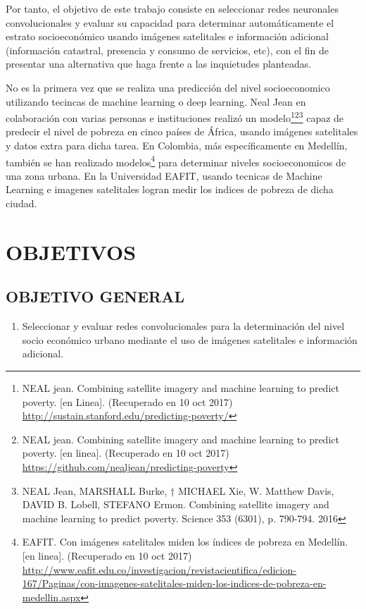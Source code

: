     Por tanto, el objetivo de este trabajo consiste en seleccionar redes neuronales convolucionales y evaluar su capacidad para determinar automáticamente el estrato socioeconómico usando imágenes satelitales e información adicional (información catastral, presencia y consumo de servicios, etc), con el fin de presentar una alternativa que haga frente a las inquietudes planteadas.
    
     No es la primera vez que se realiza una predicción del nivel socioeconomico utilizando tecincas de machine learning o deep learning. Neal Jean en colaboración con varias personas e instituciones realizó un modelo\footnote{NEAL jean. Combining satellite imagery and machine learning to predict poverty. [en Linea]. (Recuperado en 10 oct 2017) \url{http://sustain.stanford.edu/predicting-poverty/} }\footnote{NEAL jean. Combining satellite imagery and machine learning to predict poverty. [en linea]. (Recuperado en 10 oct 2017) \url{https://github.com/nealjean/predicting-poverty}}\footnote{NEAL Jean, MARSHALL Burke, † MICHAEL Xie, W. Matthew Davis, DAVID B. Lobell, STEFANO Ermon. Combining satellite imagery and machine learning to predict poverty. Science 353 (6301), p. 790-794. 2016} capaz de predecir el nivel de pobreza en cinco países de África, usando imágenes satelitales y datos extra para dicha tarea. En Colombia, más específicamente en Medellín, también se han realizado modelos\footnote{EAFIT. Con imágenes satelitales miden los índices de pobreza en Medellín. [en linea]. (Recuperado en 10 oct 2017) \url{http://www.eafit.edu.co/investigacion/revistacientifica/edicion-167/Paginas/con-imagenes-satelitales-miden-los-indices-de-pobreza-en-medellin.aspx}} para determinar niveles socioeconomicos de una zona urbana. En la Universidad EAFIT, usando tecnicas de Machine Learning e imagenes satelitales logran medir los indices de pobreza de dicha ciudad.
    
    
    
    

    \newpage\chapter{OBJETIVOS} 
	\section{OBJETIVO GENERAL}
	\begin{enumerate}
	\item Seleccionar y evaluar redes convolucionales para la determinación del nivel socio económico urbano mediante el uso de imágenes satelitales e información adicional.
	\end{enumerate}
